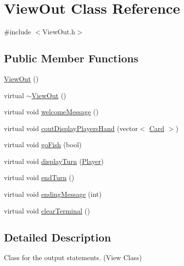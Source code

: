 \hypertarget{class_view_out}{\section{View\-Out Class Reference}
\label{class_view_out}
}


{\ttfamily \#include $<$View\-Out.\-h$>$}

\subsection*{Public Member Functions}
\begin{DoxyCompactItemize}
\item 
\hyperlink{class_view_out_a14f3add702732074db9384a4c83f1e52}{View\-Out} ()
\item 
virtual \hyperlink{class_view_out_ada8a947798c6e46b92a7ce64c21e713e}{$\sim$\-View\-Out} ()
\item 
virtual void \hyperlink{class_view_out_a4689f97048cd61ab7df83a3158d03ee7}{welcome\-Message} ()
\item 
virtual void \hyperlink{class_view_out_a5de3c71ff69ebb628b24c00339bed2ae}{cout\-Display\-Players\-Hand} (vector$<$ \hyperlink{class_card}{Card} $>$)
\item 
virtual void \hyperlink{class_view_out_af105d2c4d0404c4c31ef4ac6daa1fdf8}{go\-Fish} (bool)
\item 
virtual void \hyperlink{class_view_out_a5e24ee16b551374dbf04466696e672ac}{display\-Turn} (\hyperlink{class_player}{Player})
\item 
virtual void \hyperlink{class_view_out_a122607cb1390f24b681b590c9bd1561e}{end\-Turn} ()
\item 
virtual void \hyperlink{class_view_out_a638e1964ff9b7f796dcf4aec4056ac47}{ending\-Message} (int)
\item 
virtual void \hyperlink{class_view_out_af36d4b83ad0a29b7884027c1f8b65d16}{clear\-Terminal} ()
\end{DoxyCompactItemize}


\subsection{Detailed Description}
Class for the output statements. (View Class) 

